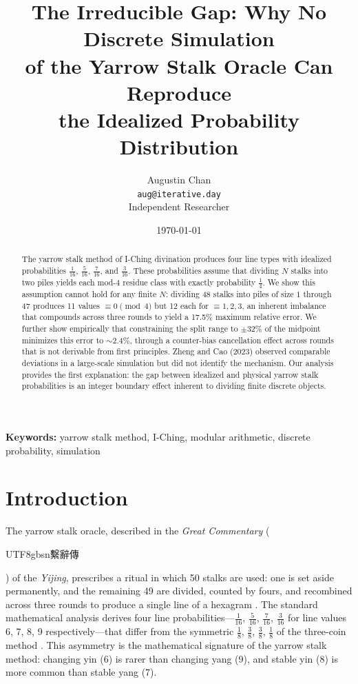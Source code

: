 \documentclass{article}
\title{The Irreducible Gap: Why No Discrete Simulation\\of the Yarrow Stalk Oracle Can Reproduce\\the Idealized Probability Distribution}
\author{Augustin Chan\\
\texttt{aug@iterative.day}\\
Independent Researcher}
\date{\today}
\begin{document}
\maketitle

\begin{abstract}
The yarrow stalk method of I-Ching divination produces four line types with idealized probabilities $\frac{1}{16}$, $\frac{5}{16}$, $\frac{7}{16}$, and $\frac{3}{16}$. These probabilities assume that dividing $N$ stalks into two piles yields each mod-4 residue class with exactly probability $\frac{1}{4}$. We show this assumption cannot hold for any finite $N$: dividing 48 stalks into piles of size $1$ through $47$ produces 11 values $\equiv 0 \pmod{4}$ but 12 each for $\equiv 1, 2, 3$, an inherent imbalance that compounds across three rounds to yield a 17.5\% maximum relative error. We further show empirically that constraining the split range to $\pm 32\%$ of the midpoint minimizes this error to $\sim$2.4\%, through a counter-bias cancellation effect across rounds that is not derivable from first principles. Zheng and Cao (2023) observed comparable deviations in a large-scale simulation but did not identify the mechanism. Our analysis provides the first explanation: the gap between idealized and physical yarrow stalk probabilities is an integer boundary effect inherent to dividing finite discrete objects.
\end{abstract}

\textbf{Keywords:} yarrow stalk method, I-Ching, modular arithmetic, discrete probability, simulation

\section{Introduction}\label{sec:introduction}

The yarrow stalk oracle, described in the \textit{Great Commentary} (\begin{CJK}{UTF8}{gbsn}繫辭傳\end{CJK}) of the \textit{Yijing}, prescribes a ritual in which 50 stalks are used: one is set aside permanently, and the remaining 49 are divided, counted by fours, and recombined across three rounds to produce a single line of a hexagram \cite{wilhelm1950iching}. The standard mathematical analysis derives four line probabilities---$\frac{1}{16}$, $\frac{5}{16}$, $\frac{7}{16}$, $\frac{3}{16}$ for line values 6, 7, 8, 9 respectively---that differ from the symmetric $\frac{1}{8}$, $\frac{3}{8}$, $\frac{3}{8}$, $\frac{1}{8}$ of the three-coin method \cite{shields1999yarrow}. This asymmetry is the mathematical signature of the yarrow stalk method: changing yin (6) is rarer than changing yang (9), and stable yin (8) is more common than stable yang (7).
\end{document}
